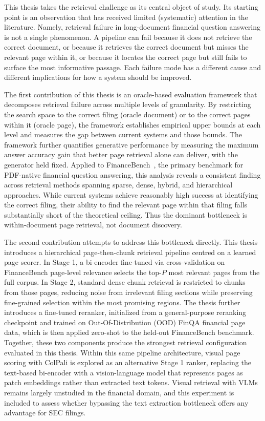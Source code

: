 \documentclass[12pt,twoside,maitrise]{dms}
\theoremstyle{definition}
\numberwithin{equation}{section}
\numberwithin{table}{chapter}
\numberwithin{figure}{chapter}
\begin{document}
This thesis takes the retrieval challenge as its central object of study. Its starting
point is an observation that has received limited (systematic) attention in the literature.
Namely, retrieval failure in long-document financial question answering is not a single
phenomenon. A pipeline can fail because it does not retrieve the correct document, or
because it retrieves the correct document but misses the relevant page within it, or
because it locates the correct page but still fails to surface the most informative
passage. Each failure mode has a different cause and different implications for how a
system should be improved.


The first contribution of this thesis is an oracle-based evaluation framework that
decomposes retrieval failure across multiple levels of granularity. By restricting the
search space to the correct filing (oracle document) or to the correct pages within it
(oracle page), the framework establishes empirical upper bounds at each level and measures
the gap between current systems and those bounds. The framework further quantifies generative performance by measuring the maximum answer accuracy gain that better page retrieval alone can deliver, with the generator held fixed. Applied to
FinanceBench~\citep{islam2023financebench}, the primary benchmark for PDF-native financial
question answering, this analysis reveals a consistent finding across retrieval methods
spanning sparse, dense, hybrid, and hierarchical approaches. While current systems achieve
reasonably high success at identifying the correct filing, their ability to find the
relevant page within that filing falls substantially short of the theoretical ceiling. Thus the
dominant bottleneck is within-document page retrieval, not document discovery.
 
The second contribution attempts to address this bottleneck directly. This thesis introduces a
hierarchical page-then-chunk retrieval pipeline centred on a learned page scorer. In Stage 1,
a bi-encoder fine-tuned via cross-validation on FinanceBench page-level relevance selects the top-$P$ most relevant pages from the full corpus. In Stage 2,
standard dense chunk retrieval is restricted to chunks from those pages, reducing noise from irrelevant filing sections while preserving fine-grained selection
within the most promising regions. The thesis further introduces a fine-tuned reranker, initialized from a general-purpose reranking checkpoint and
trained on Out-Of-Distribution (OOD) FinQA \citep{chen2021finqa} financial page data, which is then applied zero-shot to the held-out
FinanceBench benchmark. Together, these two components produce the strongest retrieval configuration evaluated in this thesis.
Within this same pipeline architecture, visual page scoring with ColPali \citep{faysse2024colpali} is explored as an alternative Stage 1 ranker, replacing the text-based bi-encoder with a vision-language model that represents pages as patch embeddings rather than extracted text tokens. Visual retrieval with VLMs remains largely unstudied in the financial domain, and this experiment is included to assess whether bypassing the text extraction bottleneck offers any advantage for SEC filings.
 
\end{document}
